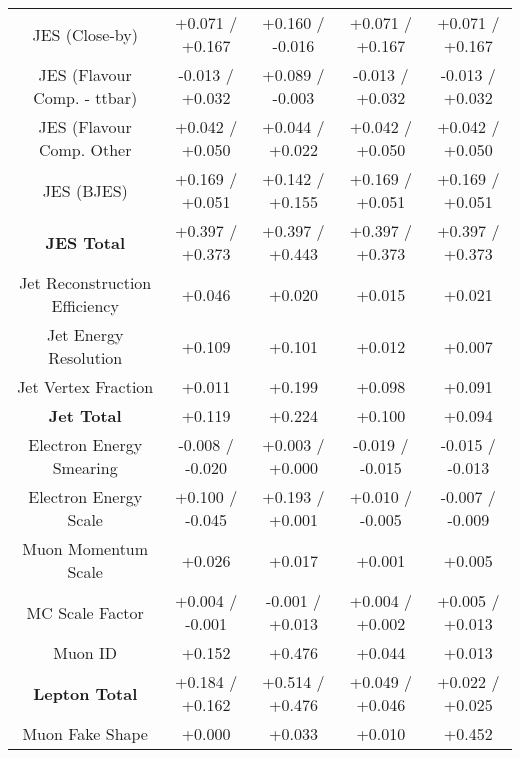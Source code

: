 \begin{table}[htbp]
\begin{center}
\begin{tabular}{|c|c|c|c|c|}
JES (Close-by)                        &+0.071   / +0.167   & +0.160   / -0.016   & +0.071   / +0.167   & +0.071   / +0.167  \\
JES (Flavour Comp. - ttbar)           &-0.013   / +0.032   & +0.089   / -0.003   & -0.013   / +0.032   & -0.013   / +0.032  \\
JES (Flavour Comp. Other              &+0.042   / +0.050   & +0.044   / +0.022   & +0.042   / +0.050   & +0.042   / +0.050  \\
JES (BJES)                            &+0.169   / +0.051   & +0.142   / +0.155   & +0.169   / +0.051   & +0.169   / +0.051  \\
\hline
\textbf{JES Total}                    &+0.397   / +0.373   & +0.397   / +0.443   & +0.397   / +0.373   & +0.397   / +0.373  \\
\hline
Jet Reconstruction Efficiency         &+0.046              & +0.020              & +0.015              & +0.021             \\
Jet Energy Resolution                 &+0.109              & +0.101              & +0.012              & +0.007             \\
Jet Vertex Fraction                   &+0.011              & +0.199              & +0.098              & +0.091             \\
\hline
\textbf{Jet Total}                    &+0.119              & +0.224              & +0.100              & +0.094             \\
\hline
Electron Energy Smearing              &-0.008   / -0.020   & +0.003   / +0.000   & -0.019   / -0.015   & -0.015   / -0.013  \\
Electron Energy Scale                 &+0.100   / -0.045   & +0.193   / +0.001   & +0.010   / -0.005   & -0.007   / -0.009  \\
Muon Momentum Scale                   &+0.026              & +0.017              & +0.001              & +0.005             \\
MC Scale Factor                       &+0.004   / -0.001   & -0.001   / +0.013   & +0.004   / +0.002   & +0.005   / +0.013  \\
Muon ID                               &+0.152              & +0.476              & +0.044              & +0.013             \\
\hline
\textbf{Lepton Total}                 &+0.184   / +0.162   & +0.514   / +0.476   & +0.049   / +0.046   & +0.022   / +0.025  \\
\hline
Muon Fake Shape                       &+0.000              & +0.033              & +0.010              & +0.452             \\

\end{tabular}
\end{center}
\end{table}
